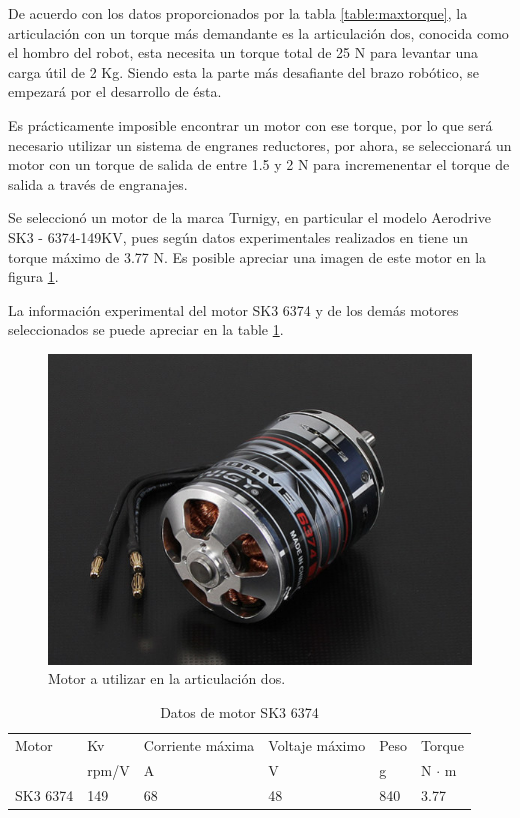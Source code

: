 De acuerdo con los datos proporcionados por la tabla \ref{table:maxtorque}, la articulación con un torque más demandante es la articulación dos, conocida como el hombro del robot, esta necesita un torque total de 25 N para levantar una carga útil de 2 Kg. Siendo esta la parte más desafiante del brazo robótico, se empezará por el desarrollo de ésta.

Es prácticamente imposible encontrar un motor con ese torque, por lo que será necesario utilizar un sistema de engranes reductores, por ahora, se seleccionará un motor con un torque de salida de entre 1.5 y 2 N para incremenentar el torque de salida a través de engranajes.

Se seleccionó un motor de la marca Turnigy, en particular el modelo Aerodrive SK3 - 6374-149KV, pues según datos experimentales realizados en \cite{odrivedoc} tiene un torque máximo de 3.77 N. Es posible apreciar una imagen de este motor en la figura \ref{fig:sk36374}.

La información experimental del motor SK3 6374 y de los demás motores seleccionados se puede apreciar en la table \ref{table:motordata}.

\begin{figure}
    \centering
    \includegraphics[scale=0.6]{./img/chapter3/sk36374.jpg}
    \caption{Motor a utilizar en la articulación dos.}
    \label{fig:sk36374}
\end{figure}

\begin{table}
\centering
\label{table:motordata}
\caption{Datos de motor SK3 6374}
\begin{tabular}{l|l|l|l|l|l|}
Motor    & Kv    & Corriente máxima & Voltaje máximo & Peso & Torque  \\
         & rpm/V & A                & V              & g    & N $\cdot$ m   \\ 
\hline
SK3 6374 & 149   & 68               & 48             & 840  & 3.77   
\end{tabular}
\end{table}

